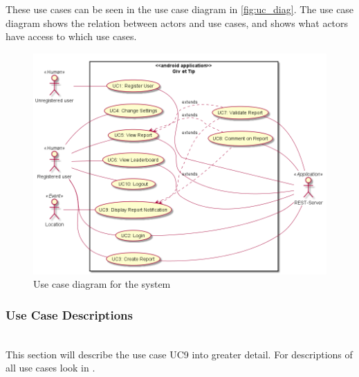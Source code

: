These use cases can be seen in the use case diagram in \autoref{fig:uc_diag}. The use case diagram shows the relation between actors and use cases, and shows what actors have access to which use cases.

\begin{figure}[hbt]
\centering
\includegraphics[width=\textwidth]{images/use_case_diagram}
\caption{Use case diagram for the system} \label{fig:uc_diag}
\end{figure}

\subsubsection{Use Case Descriptions}~\\
\noindent This section will describe the use case UC9 into greater detail. For descriptions of all use cases look in .

